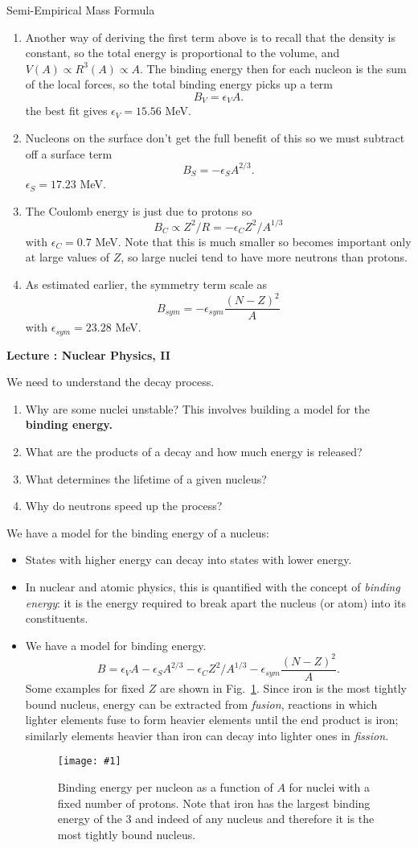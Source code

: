 \documentclass[11pt]{book}
\def\be{\begin{equation}}
\def\ee{\end{equation}}
\newcommand{\sfig}[2]{
\texttt{[image: \#1]}
        }
\newcommand{\Spng}[2]{
   \begin{figure}[thbp]
   \begin{center}
    \sfig{../Figures/#1.png}{0.7\columnwidth}
    \caption{{\small #2}}
    \label{fig:#1}
     \end{center}
   \end{figure}
}
\newcommand{\rf}[1]{\ref{fig:#1}}
\newcommand\bei{\begin{itemize}}
\newcommand\eei{\end{itemize}}
\newcommand\bee{\begin{enumerate}}
\newcommand\eee{\end{enumerate}}
\newcommand\lecture[1]{\newpage
\addtocounter{lectureno}{1}
\setcounter{secno}{0}
\begin{center}
 {\bf Lecture \arabic{lectureno}: #1}
\end{center}
}
\newcounter{lectureno}
\newcounter{secno}
\begin{document}
Semi-Empirical Mass Formula
\bee
\item Another way of deriving the first term above is to recall that the density is constant, so the total energy is proportional to the volume, and $V(A)\propto R^3(A) \propto A$. 
The binding energy then for each nucleon is the sum of the local forces, so the total binding energy picks up a term 
\be
B_V=\epsilon_VA.
\ee
the best fit gives $\epsilon_V=15.56$ MeV.
\item Nucleons on the surface don't get the full benefit of this so we must subtract off a surface term
\be
B_S=-\epsilon_SA^{2/3}.\ee
$\epsilon_S=17.23$ MeV.
\item The Coulomb energy is just due to protons so 
\be
B_C \propto Z^2/R = -\epsilon_C Z^2/A^{1/3}\ee
with $\epsilon_C=0.7$ MeV. Note that this is much smaller so becomes important only at large values of $Z$, so large nuclei tend to have more neutrons than protons.
\item As estimated earlier, the symmetry term scale as
\be
B_{sym}=-\epsilon_{sym} \frac{(N-Z)^2}{A}\ee
with $\epsilon_{sym}=23.28$ MeV.
\eee

\lecture{Nuclear Physics, II}
We need to understand the decay process.
\bee
\item Why are some nuclei unstable? This involves building a model for the {\bf binding energy.}
\item What are the products of a decay and how much energy is released?
\item What determines the lifetime of a given nucleus?
\item Why do neutrons speed up the process?
\eee
We have a model for the binding energy of a nucleus:
\bei
\item States with higher energy can decay into states with lower energy.
\item In nuclear and atomic physics, this is quantified with the concept of {\it binding energy}: it is the energy required to break apart the nucleus (or atom) into its constituents.
\item We have a model for binding energy. 
\be
B=\epsilon_VA-\epsilon_SA^{2/3}-\epsilon_C Z^2/A^{1/3}-\epsilon_{sym} \frac{(N-Z)^2}{A}.\ee
Some examples for fixed $Z$ are shown in Fig.~\rf{bez}. Since iron is the most tightly bound nucleus, energy can be extracted from {\it fusion}, reactions in which lighter elements fuse to form heavier elements until the end product is iron; similarly elements heavier than iron can decay into lighter ones in {\it fission}.
\Spng{bez}{Binding energy per nucleon as a function of $A$ for nuclei with a fixed number of protons. Note that iron has the largest binding energy of the 3 and indeed of any nucleus and therefore it is the most tightly bound nucleus.}
\eei
\end{document}
